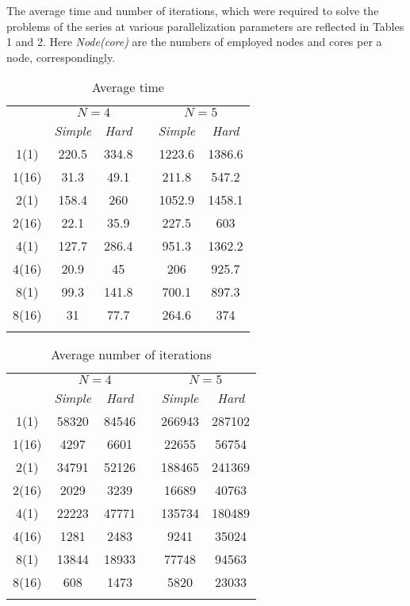 \documentclass[smallextended]{svjour3}       %
\begin{document}
The average time and number of iterations, which were required to solve the problems of the series at various parallelization parameters are reflected in Tables 1 and 2. Here \textit{Node(core)} are the numbers of employed nodes and cores per a node, correspondingly.

\begin{table}
	\caption{Average time}
	\label{tab:1}
	\center
	\begin{tabular}{cccccc}
		\hline\noalign{\smallskip}
		\multirow{2}{*}{\textit{Node(core)}} & \multicolumn{2}{c}{ $N=4$ } & & \multicolumn{2}{c}{$N=5$} \\
		\noalign{\smallskip} \cline{2-3} \cline{5-6} \noalign{\smallskip}
		 & \textit{Simple} & \textit{Hard} & & \textit{Simple} & \textit{Hard}  \\
		\noalign{\smallskip} \hline \noalign{\smallskip}
1(1)	&	220.5	&	334.8	&	&	1223.6	&	1386.6	\\
1(16)	&	31.3	&	49.1	&	&	211.8	&	547.2	\\
2(1)	&	158.4	&	260	&	&	1052.9	&	1458.1	\\
2(16)	&	22.1	&	35.9	&	&	227.5	&	603	\\
4(1)	&	127.7	&	286.4	&	&	951.3	&	1362.2	\\
4(16)	&	20.9	&	45	&	&	206	&	925.7	\\
8(1)	&	99.3	&	141.8	&	&	700.1	&	897.3	\\
8(16)	&	31	&	77.7	&	&	264.6	&	374	\\
		\noalign{\smallskip}\hline
	\end{tabular}
\end{table}

\begin{table}
	\caption{Average number of iterations}
	\label{tab:2}
	\center
	\begin{tabular}{cccccc}
		\hline\noalign{\smallskip}
		\multirow{2}{*}{\textit{Node(core)}}	 & \multicolumn{2}{c}{ $N=4$ } & & \multicolumn{2}{c}{$N=5$} \\
		\noalign{\smallskip} \cline{2-3} \cline{5-6} \noalign{\smallskip}
		 & \textit{Simple} & \textit{Hard} & & \textit{Simple} & \textit{Hard}  \\
		\noalign{\smallskip} \hline \noalign{\smallskip}
1(1)	&	58320	&	84546	&	&	266943	&	287102	\\
1(16)	&	4297	&	6601	&	&	22655	&	56754	\\
2(1)	&	34791	&	52126	&	&	188465	&	241369	\\
2(16)	&	2029	&	3239	&	&	16689	&	40763	\\
4(1)	&	22223	&	47771	&	&	135734	&	180489	\\
4(16)	&	1281	&	2483	&	&	9241	&	35024	\\
8(1)	&	13844	&	18933	&	&	77748	&	94563	\\
8(16)	&	608	&	1473	&	&	5820	&	23033	\\
		\noalign{\smallskip}\hline
	\end{tabular}
\end{table}
\end{document}
